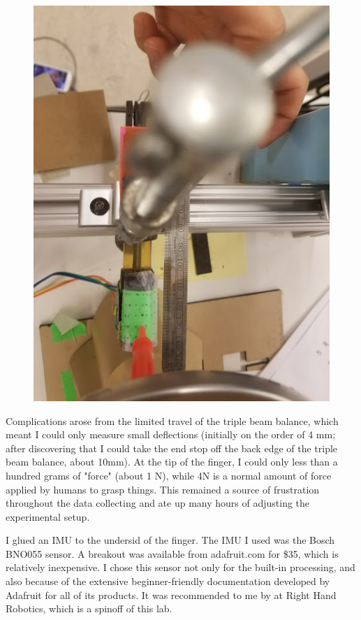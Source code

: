 \documentclass[12pt]{article}
\begin{document}
\begin{figure}[H]
\centering
\includegraphics[width=.3\textheight]{images/setup/grid.jpg}
\end{figure}


Complications arose from the limited travel of the triple beam balance, which meant I could only
measure small deflections (initially on the order of 4 mm; after discovering that I could take the
end stop off the back edge of the triple beam balance, about 10mm). At the tip of the finger, I
could only less than a hundred grams of "force" (about 1 N), while 4N is a normal amount of force
applied by humans to grasp things. This remained a source of frustration throughout the data
collecting and ate up many hours of adjusting the experimental setup. 

I glued an IMU to the undersid of the finger. The IMU I used was the Bosch BNO055 sensor. A breakout
was available from adafruit.com for \$35, which is relatively inexpensive.  I chose this sensor not
only for the built-in processing, and also because of the extensive beginner-friendly documentation
developed by Adafruit for all of its products. It was recommended to me by 
at Right Hand Robotics, which is a spinoff of this lab.
\end{document}
